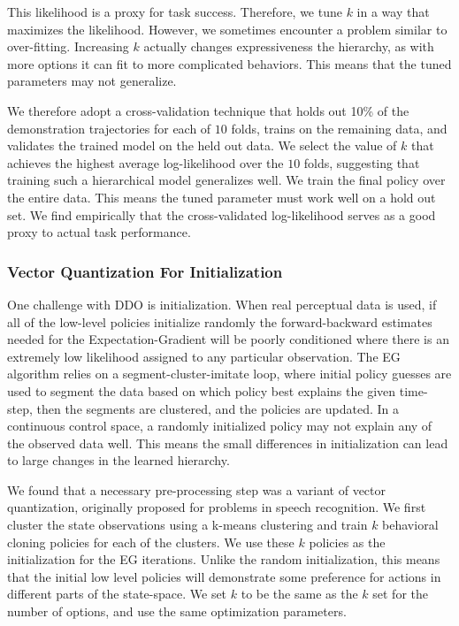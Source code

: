 This likelihood is a proxy for task success.
Therefore, we tune $k$ in a way that maximizes the likelihood.
However, we sometimes encounter a problem similar to over-fitting.
Increasing $k$ actually changes expressiveness the hierarchy, as with more options it can fit to more complicated behaviors.
This means that the tuned parameters may not generalize.

We therefore adopt a cross-validation technique that holds out 10\% of the demonstration trajectories for each of $10$ folds, trains on the remaining data, and validates the trained model on the held out data.
We select the value of $k$ that achieves the highest average log-likelihood over the $10$ folds, suggesting that training such a hierarchical model generalizes well.
We train the final policy over the entire data.
This means the tuned parameter must work well on a hold out set.
We find empirically that the cross-validated log-likelihood serves as a good proxy to actual task performance.

\subsubsection{Vector Quantization For Initialization}
One challenge with DDO is initialization.
When real perceptual data is used, if all of the low-level policies initialize randomly the forward-backward estimates needed for the Expectation-Gradient will be poorly conditioned where there is an extremely low likelihood assigned to any particular observation.
The EG algorithm relies on a segment-cluster-imitate loop, where initial policy guesses are used to segment the data based on which policy best explains the given time-step, then the segments are clustered, and the policies are updated.
In a continuous control space, a randomly initialized policy may not explain any of the observed data well.
This means the small differences in initialization can lead to large changes in the learned hierarchy.

We found that a necessary pre-processing step was a variant of vector quantization, originally proposed for problems in speech recognition. 
We first cluster the state observations using a \textsf{k-means} clustering and train $k$ behavioral cloning policies for each of the clusters.
We use these $k$ policies as the initialization for the EG iterations.
Unlike the random initialization, this means that the initial low level policies will demonstrate some preference for actions in different parts of the state-space.
We set $k$ to be the same as the $k$ set for the number of options, and use the same optimization parameters.

